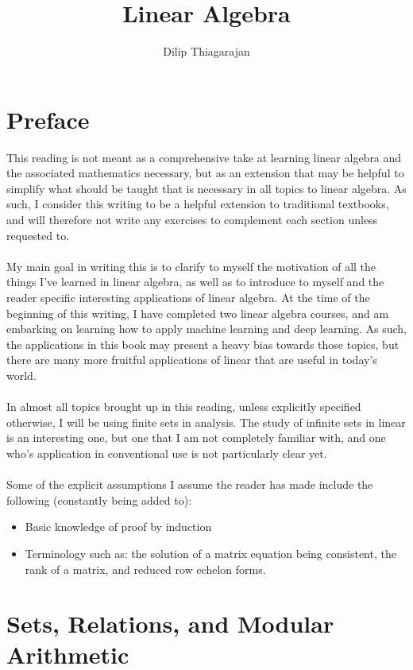 \documentclass[11pt]{report}
\begin{document}
\title{Linear Algebra}
\author{Dilip Thiagarajan}
\maketitle
\tableofcontents{}
\chapter*{Preface}
This reading is not meant as a comprehensive take at learning linear algebra and the associated mathematics necessary, but as an extension that may be helpful to simplify what should be taught that is necessary in all topics to linear algebra. As such, I consider this writing to be a helpful extension to traditional textbooks, and will therefore not write any exercises to complement each section unless requested to.
\\ \\
My main goal in writing this is to clarify to myself the motivation of all the things I've learned in linear algebra, as well as to introduce to myself and the reader specific interesting applications of linear algebra. At the time of the beginning of this writing, I have completed two linear algebra courses, and am embarking on learning how to apply machine learning and deep learning. As such, the applications in this book may present a heavy bias towards those topics, but there are many more fruitful applications of linear that are useful in today's world.
\\ \\
In almost all topics brought up in this reading, unless explicitly specified otherwise, I will be using finite sets in analysis. The study of infinite sets in linear is an interesting one, but one that I am not completely familiar with, and one who's application in conventional use is not particularly clear yet.
\\ \\
Some of the explicit assumptions I assume the reader has made include the following (constantly being added to):
\begin{itemize}
\item Basic knowledge of proof by induction
\item Terminology such as: the solution of a matrix equation being consistent, the rank of a matrix, and reduced row echelon forms.
\end{itemize}

\chapter{Sets, Relations, and Modular Arithmetic}
\end{document}
